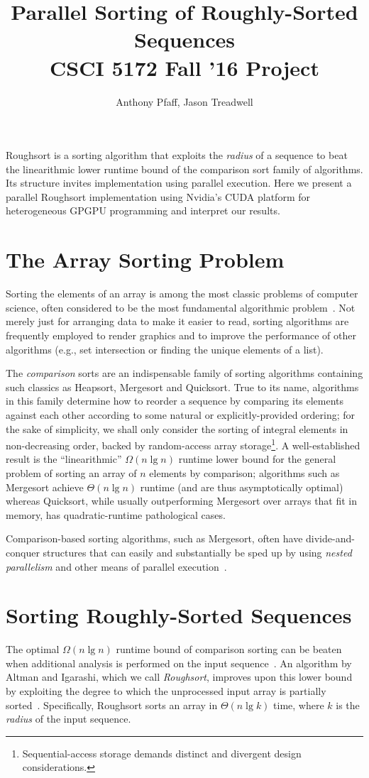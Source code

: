 \documentclass[letterpaper, 12pt]{article}
\title{Parallel Sorting of Roughly-Sorted Sequences\\CSCI 5172 Fall '16 Project}
\author{Anthony Pfaff, Jason Treadwell}
\let\supercite\cite
\renewcommand{\cite}[1]{\textnormal{~\supercite{#1}}}
\begin{document}
\maketitle

Roughsort is a sorting algorithm that exploits the \textit{radius} of a sequence to beat the linearithmic
  lower runtime bound of the comparison sort family of algorithms.
Its structure invites implementation using parallel execution.
Here we present a parallel Roughsort implementation using Nvidia's CUDA platform for heterogeneous GPGPU programming and
  interpret our results.

\section{The Array Sorting Problem}
Sorting the elements of an array is among the most classic problems of computer science, often
  considered to be the most fundamental algorithmic problem\cite{clrs}.
Not merely just for arranging data to make it easier to read, sorting algorithms are frequently employed to render graphics
  and to improve the performance of other algorithms (e.g., set intersection or finding the unique elements of a list).

The \textit{comparison} sorts are an indispensable family of sorting algorithms containing such classics as Heapsort,
  Mergesort and Quicksort.
True to its name, algorithms in this family determine how to reorder a sequence by comparing its elements against each other
  according to some natural or explicitly-provided ordering;
  for the sake of simplicity, we shall only consider the sorting of integral elements in non-decreasing order, backed by
  random-access array storage\footnote{Sequential-access storage demands distinct and divergent design considerations.}.
A well-established result is the ``linearithmic'' $\Omega(n \lg n)$ runtime lower bound for the general problem of sorting
  an array of $n$ elements by comparison; algorithms such as Mergesort achieve $\Theta(n \lg n)$ runtime (and are thus
  asymptotically optimal) whereas Quicksort, while usually outperforming Mergesort over arrays that fit in memory,
  has quadratic-runtime pathological cases.

Comparison-based sorting algorithms, such as Mergesort, often have divide-and-conquer structures that can easily and
  substantially be sped up by using \textit{nested parallelism} and other means of parallel execution\cite{clrs}.

\section{Sorting Roughly-Sorted Sequences}
The optimal $\Omega(n \lg n)$ runtime bound of comparison sorting can be beaten when additional analysis is performed on the
  input sequence\cite{clrs}.
An algorithm by Altman and Igarashi, which we call \textit{Roughsort}, improves upon this lower bound by exploiting the degree
  to which the unprocessed input array is partially sorted\cite{altman89}.
Specifically, Roughsort sorts an array in $\Theta(n \lg k)$ time, where $k$ is the \textit{radius} of the input sequence.
\end{document}

